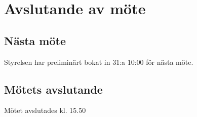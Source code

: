 \documentclass[protokoll]{dvd}
\begin{document}
\section{Avslutande av möte}

\subsection{Nästa möte}
Styrelsen har preliminärt bokat in 31:a 10:00 för nästa möte.

\subsection{Mötets avslutande}
Mötet avslutades kl. 15.50

\styrelsesignaturer
\end{document}
